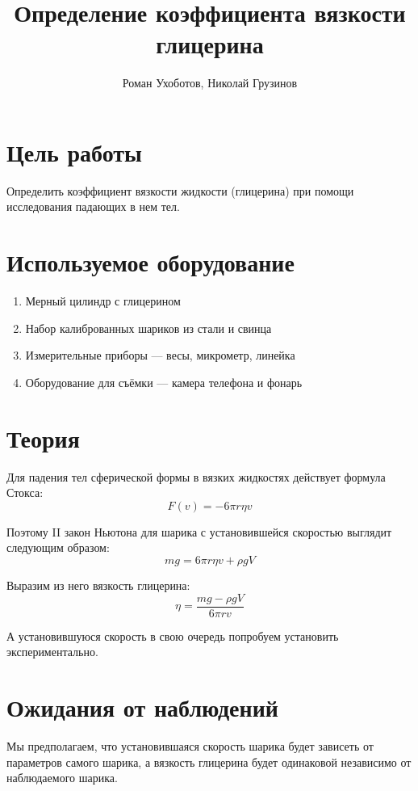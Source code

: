 \documentclass[a4paper, 12pt]{article}
\title{Определение коэффициента вязкости глицерина}
\author{Роман Ухоботов, Николай Грузинов}
\date{}%
\begin{document}
    \maketitle


    \section{Цель работы}\label{sec:target}
    Определить коэффициент вязкости жидкости (глицерина) при помощи исследования падающих в нем тел.


    \section{Используемое оборудование}\label{sec:tools}
    \begin{enumerate}
        \item Мерный цилиндр с глицерином
        \item Набор калиброванных шариков из стали и свинца
        \item Измерительные приборы --- весы, микрометр, линейка
        \item Оборудование для съёмки --- камера телефона и фонарь
    \end{enumerate}


    \section{Теория}\label{sec:theory}

    Для падения тел сферической формы в вязких жидкостях действует формула Стокса:
    \[F(v) = -6 \pi r \eta v\]

    Поэтому II закон Ньютона для шарика с установившейся скоростью выглядит следующим образом:
    \[m g = 6 \pi r \eta v + \rho g V\]

    Выразим из него вязкость глицерина:
    \[ \eta = \frac{m g - \rho g V}{6 \pi r v} \]

    А установившуюся скорость в свою очередь попробуем установить экспериментально.


    \section{Ожидания от наблюдений}

    Мы предполагаем, что установившаяся скорость шарика будет зависеть от параметров самого шарика,
    а вязкость глицерина будет одинаковой независимо от наблюдаемого шарика.
\end{document}
